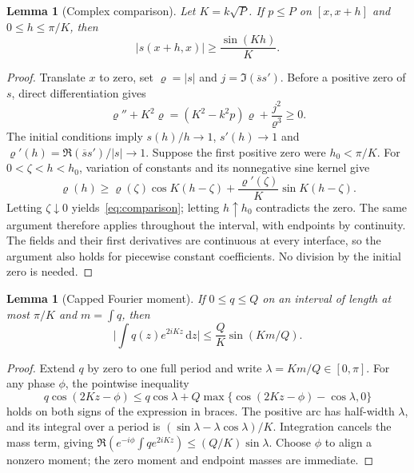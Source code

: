 \documentclass[11pt,a4paper]{article}
\newtheorem{lemma}[theorem]{Lemma}
\theoremstyle{remark}
\newcommand{\abs}[1]{\lvert #1\rvert}
\newcommand{\dd}{\,\mathrm d}
\begin{document}
\begin{lemma}[Complex comparison]\label{lem:comparison}
Let $K=k\sqrt P$. If $p\leq P$ on $[x,x+h]$ and $0\leq h\leq\pi/K$, then
\begin{equation}\label{eq:comparison}
 \abs{s(x+h,x)}\geq\frac{\sin(Kh)}{K}.
\end{equation}
\end{lemma}
\begin{proof}
Translate $x$ to zero, set $\varrho=\abs s$ and $j=\Im(\overline s s')$. Before a positive zero of $s$, direct differentiation gives
\[
 \varrho''+K^2\varrho=(K^2-k^2p)\varrho+\frac{j^2}{\varrho^3}\geq0.
\]
The initial conditions imply $s(h)/h\to1$, $s'(h)\to1$ and $\varrho'(h)=\Re(\overline s s')/\abs s\to1$. Suppose the first positive zero were $h_0<\pi/K$. For $0<\zeta<h<h_0$, variation of constants and its nonnegative sine kernel give
\[
 \varrho(h)\geq\varrho(\zeta)\cos K(h-\zeta)
       +\frac{\varrho'(\zeta)}K\sin K(h-\zeta).
\]
Letting $\zeta\downarrow0$ yields~\eqref{eq:comparison}; letting $h\uparrow h_0$ contradicts the zero. The same argument therefore applies throughout the interval, with endpoints by continuity. The fields and their first derivatives are continuous at every interface, so the argument also holds for piecewise constant coefficients. No division by the initial zero is needed.
\end{proof}

\begin{lemma}[Capped Fourier moment]\label{lem:moment}
If $0\leq q\leq Q$ on an interval of length at most $\pi/K$ and $m=\int q$, then
\begin{equation}\label{eq:moment}
 \abs{\int q(z)e^{2iKz}\dd z}\leq\frac QK\sin(Km/Q).
\end{equation}
\end{lemma}
\begin{proof}
Extend $q$ by zero to one full period and write $\lambda=Km/Q\in[0,\pi]$. For any phase $\phi$, the pointwise inequality
\[
 q\cos(2Kz-\phi)\leq q\cos\lambda
   +Q\max\{\cos(2Kz-\phi)-\cos\lambda,0\}
\]
holds on both signs of the expression in braces. The positive arc has half-width $\lambda$, and its integral over a period is $(\sin\lambda-\lambda\cos\lambda)/K$. Integration cancels the mass term, giving $\Re(e^{-i\phi}\int qe^{2iKz})\leq(Q/K)\sin\lambda$. Choose $\phi$ to align a nonzero moment; the zero moment and endpoint masses are immediate.
\end{proof}
\end{document}
